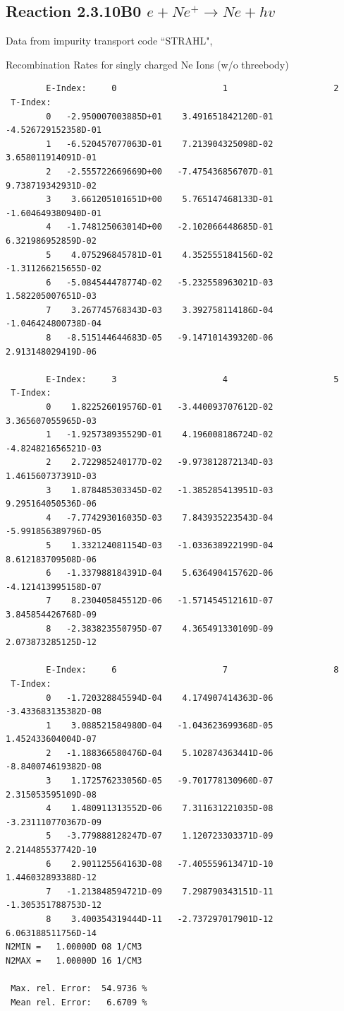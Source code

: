 \documentclass[12pt,dvipdfmx]{article}
\begin{document}
\subsection{
Reaction 2.3.10B0   $e + Ne^+ \rightarrow  Ne + hv$ }

Data from impurity transport code ``STRAHL", \cite{kn:Behringer}

  Recombination Rates for singly charged Ne Ions (w/o threebody)



\begin{small}\begin{verbatim}
        E-Index:     0                     1                     2
 T-Index:
        0   -2.950007003885D+01    3.491651842120D-01   -4.526729152358D-01
        1   -6.520457077063D-01    7.213904325098D-02    3.658011914091D-01
        2   -2.555722669669D+00   -7.475436856707D-01    9.738719342931D-02
        3    3.661205101651D+00    5.765147468133D-01   -1.604649380940D-01
        4   -1.748125063014D+00   -2.102066448685D-01    6.321986952859D-02
        5    4.075296845781D-01    4.352555184156D-02   -1.311266215655D-02
        6   -5.084544478774D-02   -5.232558963021D-03    1.582205007651D-03
        7    3.267745768343D-03    3.392758114186D-04   -1.046424800738D-04
        8   -8.515144644683D-05   -9.147101439320D-06    2.913148029419D-06

        E-Index:     3                     4                     5
 T-Index:
        0    1.822526019576D-01   -3.440093707612D-02    3.365607055965D-03
        1   -1.925738935529D-01    4.196008186724D-02   -4.824821656521D-03
        2    2.722985240177D-02   -9.973812872134D-03    1.461560737391D-03
        3    1.878485303345D-02   -1.385285413951D-03    9.295164050536D-06
        4   -7.774293016035D-03    7.843935223543D-04   -5.991856389796D-05
        5    1.332124081154D-03   -1.033638922199D-04    8.612183709508D-06
        6   -1.337988184391D-04    5.636490415762D-06   -4.121413995158D-07
        7    8.230405845512D-06   -1.571454512161D-07    3.845854426768D-09
        8   -2.383823550795D-07    4.365491330109D-09    2.073873285125D-12

        E-Index:     6                     7                     8
 T-Index:
        0   -1.720328845594D-04    4.174907414363D-06   -3.433683135382D-08
        1    3.088521584980D-04   -1.043623699368D-05    1.452433604004D-07
        2   -1.188366580476D-04    5.102874363441D-06   -8.840074619382D-08
        3    1.172576233056D-05   -9.701778130960D-07    2.315053595109D-08
        4    1.480911313552D-06    7.311631221035D-08   -3.231110770367D-09
        5   -3.779888128247D-07    1.120723303371D-09    2.214485537742D-10
        6    2.901125564163D-08   -7.405559613471D-10    1.446032893388D-12
        7   -1.213848594721D-09    7.298790343151D-11   -1.305351788753D-12
        8    3.400354319444D-11   -2.737297017901D-12    6.063188511756D-14
N2MIN =   1.00000D 08 1/CM3
N2MAX =   1.00000D 16 1/CM3

 Max. rel. Error:  54.9736 %
 Mean rel. Error:   6.6709 %

\end{verbatim}\end{small}
\end{document}
